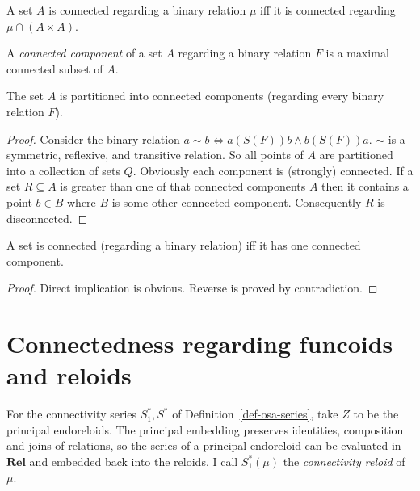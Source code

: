 \begin{cor}
A set $A$ is connected regarding a binary relation $\mu$ iff it
is connected regarding $\mu\cap(A\times A)$.\end{cor}
\begin{defn}
A \emph{connected component} of a set
$A$ regarding a binary relation $F$ is a maximal connected subset
of $A$.\end{defn}
\begin{thm}
The set $A$ is partitioned into connected components (regarding every
binary relation $F$).\end{thm}
\begin{proof}
Consider the binary relation $a\sim b\Leftrightarrow a\mathrel{(S(F))}b\wedge b\mathrel{(S(F))}a$.
$\sim$ is a symmetric, reflexive, and transitive relation. So all
points of $A$ are partitioned into a collection of sets $Q$. Obviously
each component is (strongly) connected. If a set $R\subseteq A$ is
greater than one of that connected components $A$ then it contains
a point $b\in B$ where $B$ is some other connected component. Consequently
$R$ is disconnected.\end{proof}
\begin{prop}
A set is connected (regarding a binary relation) iff it has one connected
component.\end{prop}
\begin{proof}
Direct implication is obvious. Reverse is proved by contradiction.
\end{proof}

\section{Connectedness regarding funcoids and reloids}
For the connectivity series $S_1^\ast,S^\ast$ of
Definition~\ref{def-osa-series}, take $Z$ to be the principal
endoreloids. The principal embedding preserves identities,
composition and joins of relations, so the series of a principal
endoreloid can be evaluated in $\mathbf{Rel}$ and embedded back
into the reloids. I call $S_1^\ast(\mu)$ the \emph{connectivity reloid}
of $\mu$.

